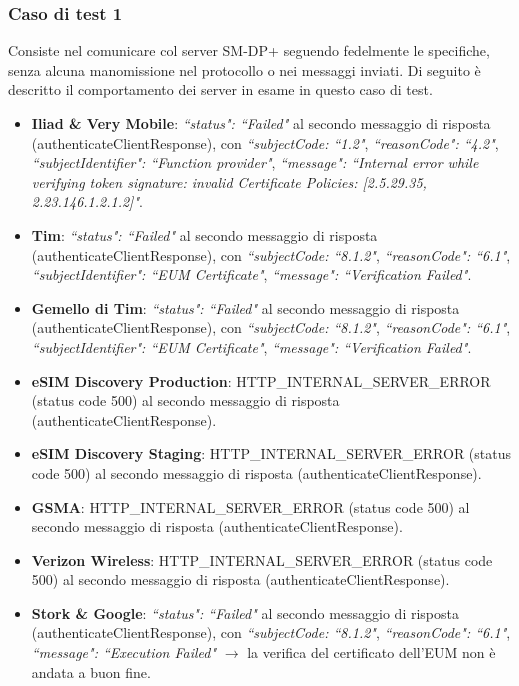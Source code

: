 \documentclass[10pt, oneside]{book}
\begin{document}
\subsubsection{Caso di test 1}
Consiste nel comunicare col server SM-DP+ seguendo fedelmente le specifiche, senza alcuna manomissione nel protocollo o nei messaggi inviati. Di seguito è descritto il comportamento dei server in esame in questo caso di test.
\begin{itemize}
\item \textbf{Iliad \& Very Mobile}: \textit{``status": ``Failed"} al secondo messaggio di risposta (authenticateClientResponse), con \textit{``subjectCode: ``1.2"}, \textit{``reasonCode": ``4.2"}, \textit{``subjectIdentifier": ``Function provider"}, \textit{``message": ``Internal error while verifying token signature: invalid Certificate Policies: [2.5.29.35, 2.23.146.1.2.1.2]"}.
\item \textbf{Tim}: \textit{``status": ``Failed"} al secondo messaggio di risposta (authenticateClientResponse), con \textit{``subjectCode: ``8.1.2"}, \textit{``reasonCode": ``6.1"}, \textit{``subjectIdentifier": ``EUM Certificate"}, \textit{``message": ``Verification Failed"}.
\item \textbf{Gemello di Tim}: \textit{``status": ``Failed"} al secondo messaggio di risposta (authenticateClientResponse), con \textit{``subjectCode: ``8.1.2"}, \textit{``reasonCode": ``6.1"}, \textit{``subjectIdentifier": ``EUM Certificate"}, \textit{``message": ``Verification Failed"}.
\item \textbf{eSIM Discovery Production}: HTTP\_INTERNAL\_SERVER\_ERROR (status code 500) al secondo messaggio di risposta (authenticateClientResponse).
\item \textbf{eSIM Discovery Staging}: HTTP\_INTERNAL\_SERVER\_ERROR (status code 500) al secondo messaggio di risposta (authenticateClientResponse).
\item \textbf{GSMA}: HTTP\_INTERNAL\_SERVER\_ERROR (status code 500) al secondo messaggio di risposta (authenticateClientResponse).
\item \textbf{Verizon Wireless}: HTTP\_INTERNAL\_SERVER\_ERROR (status code 500) al secondo messaggio di risposta (authenticateClientResponse).
\item \textbf{Stork \& Google}: \textit{``status": ``Failed"} al secondo messaggio di risposta (authenticateClientResponse), con \textit{``subjectCode: ``8.1.2"}, \textit{``reasonCode": ``6.1"}, \textit{``message": ``Execution Failed"} $\rightarrow$ la verifica del certificato dell'EUM non è andata a buon fine.

\end{itemize}
\end{document}
